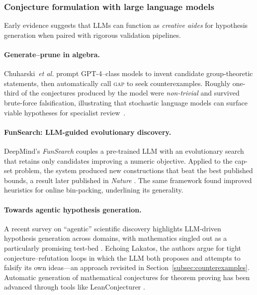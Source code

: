 \documentclass[acmsmall,anonymous]{acmart}
\begin{document}
\subsubsection{Conjecture formulation with large language models}
\label{subsec:conjLLM}
Early evidence suggests that LLMs can function as \emph{creative aides}
for hypothesis generation when paired with rigorous validation
pipelines.

\paragraph{Generate–prune in algebra.}
Chuharski~\emph{et al.} prompt GPT-4–class models to invent candidate
group-theoretic statements, then automatically call \textsc{gap} to seek
counterexamples. Roughly one-third of the conjectures produced by the
model were \emph{non-trivial} and survived brute-force falsification,
illustrating that stochastic language models can surface viable
hypotheses for specialist review~\cite{chuharski2024conjecture}.

\paragraph{FunSearch: LLM-guided evolutionary discovery.}
DeepMind’s \emph{FunSearch} couples a pre-trained LLM with an
evolutionary search that retains only candidates improving a numeric
objective. Applied to the cap-set problem, the system produced new
constructions that beat the best published bounds, a result
later published in \emph{Nature}
\cite{romeraparedes2024funsearch}. The same framework found improved
heuristics for online bin-packing, underlining its generality.

\paragraph{Towards agentic hypothesis generation.}
A recent survey on “agentic” scientific discovery highlights LLM-driven
hypothesis generation across domains, with mathematics singled out as a
particularly promising test-bed
\cite{agentichypothesis2025survey}. Echoing Lakatos, the authors argue
for tight conjecture–refutation loops in which the LLM both proposes and
attempts to falsify its own ideas—an approach revisited in
Section~\ref{subsec:counterexamples}. Automatic generation of mathematical conjectures for theorem proving has been advanced through tools like LeanConjecturer \cite{anonymous2025leanconjecturer}.
\end{document}
